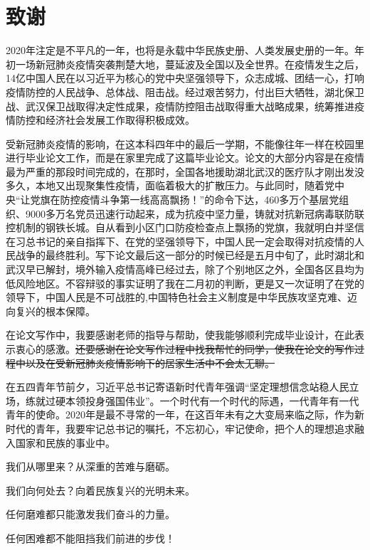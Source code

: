\chapter*{致谢}

2020年注定是不平凡的一年，也将是永载中华民族史册、人类发展史册的一年。年初一场新冠肺炎疫情突袭荆楚大地，蔓延波及全国以及全世界。在疫情发生之后，14亿中国人民在以习近平为核心的党中央坚强领导下，众志成城、团结一心，打响疫情防控的人民战争、总体战、阻击战。经过艰苦努力，付出巨大牺牲，湖北保卫战、武汉保卫战取得决定性成果，疫情防控阻击战取得重大战略成果，统筹推进疫情防控和经济社会发展工作取得积极成效。

受新冠肺炎疫情的影响，在这本科四年中的最后一学期，不能像往年一样在校园里进行毕业论文工作，而是在家里完成了这篇毕业论文。论文的大部分内容是在疫情最为严重的那段时间完成的，在那时，全国各地援助湖北武汉的医疗队才刚出发没多久，本地又出现聚集性疫情，面临着极大的扩散压力。与此同时，随着党中央“让党旗在防控疫情斗争第一线高高飘扬！”的命令下达，460多万个基层党组织、9000多万名党员迅速行动起来，成为抗疫中坚力量，铸就对抗新冠病毒联防联控机制的钢铁长城。自从看到小区门口防疫检查点上飘扬的党旗，我就明白并坚信在习总书记的亲自指挥下、在党的坚强领导下，中国人民一定会取得对抗疫情的人民战争的最终胜利。写下论文最后这一部分的时候已经是五月中旬了，此时湖北和武汉早已解封，境外输入疫情高峰已经过去，除了个别地区之外，全国各区县均为低风险地区。不容辩驳的事实证明了我在二月初的判断，更是又一次证明了在党的领导下，中国人民是不可战胜的,中国特色社会主义制度是中华民族攻坚克难、迈向复兴的根本保障。


在论文写作中，我要感谢老师的指导与帮助，使我能够顺利完成毕业设计，在此表示衷心的感激。\sout{还要感谢在论文写作过程中找我帮忙的同学，使我在论文的写作过程中以及在受新冠肺炎疫情影响下的居家生活中不会太无聊。}

在五四青年节前夕，习近平总书记寄语新时代青年强调“坚定理想信念站稳人民立场，练就过硬本领投身强国伟业”。一个时代有一个时代的际遇，一代青年有一代青年的使命。2020年是最不寻常的一年，在这百年未有之大变局来临之际，作为新时代的青年，我要牢记总书记的嘱托，不忘初心，牢记使命，把个人的理想追求融入国家和民族的事业中。

我们从哪里来？从深重的苦难与磨砺。

我们向何处去？向着民族复兴的光明未来。

任何磨难都只能激发我们奋斗的力量。

任何困难都不能阻挡我们前进的步伐！



　


